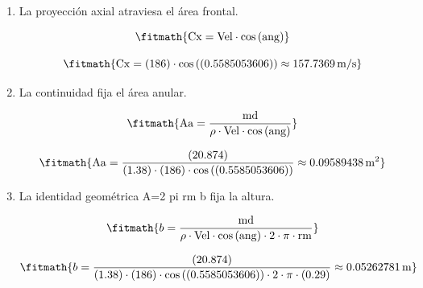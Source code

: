 \begin{enumerate}

\item La proyección axial atraviesa el área frontal.

\[\fitmath{\mathrm{Cx}=\mathrm{Vel}\cdot \cos\left(\mathrm{ang}\right)}\]

\[\fitmath{\mathrm{Cx}=(186)\cdot \cos\left((0.5585053606)\right)\approx 157.7369\,\mathrm{m/s}}\]

\item La continuidad fija el área anular.

\[\fitmath{\mathrm{Aa}=\frac{\mathrm{md}}{\rho\cdot \mathrm{Vel}\cdot \cos\left(\mathrm{ang}\right)}}\]

\[\fitmath{\mathrm{Aa}=\frac{(20.874)}{(1.38)\cdot (186)\cdot \cos\left((0.5585053606)\right)}\approx 0.09589438\,\mathrm{m^{2}}}\]

\item La identidad geométrica A=2 pi rm b fija la altura.

\[\fitmath{b=\frac{\mathrm{md}}{\rho\cdot \mathrm{Vel}\cdot \cos\left(\mathrm{ang}\right)\cdot 2\cdot \pi\cdot \mathrm{rm}}}\]

\[\fitmath{b=\frac{(20.874)}{(1.38)\cdot (186)\cdot \cos\left((0.5585053606)\right)\cdot 2\cdot \pi\cdot (0.29)}\approx 0.05262781\,\mathrm{m}}\]

\end{enumerate}
